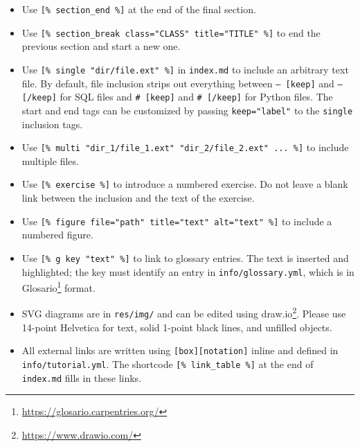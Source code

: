 \documentclass[krantzl]{krantz}
\newcommand{\hreffoot}[2]{{#1}\footnote{\href{#2}{#2}}}
\begin{document}
\begin{itemize}
\item 

Use \texttt{[\% section\_end \%]}
    at the end of the final section.



\item 

Use \texttt{[\% section\_break class="CLASS" title="TITLE" \%]}
    to end the previous section and start a new one.



\item 

Use \texttt{[\% single "dir/file.ext" \%]}
    in \texttt{index.md} to include an arbitrary text file.
    By default, file inclusion strips out everything between \texttt{-- [keep]} and \texttt{-- [/keep]}
    for SQL files and \texttt{\# [keep]} and \texttt{\# [/keep]} for Python files.
    The start and end tags can be customized by passing \texttt{keep="label"}
    to the \texttt{single} inclusion tags.



\item 

Use \texttt{[\% multi "dir\_1/file\_1.ext" "dir\_2/file\_2.ext" ... \%]}
    to include multiple files.



\item 

Use \texttt{[\% exercise \%]} to introduce a numbered exercise.
    Do not leave a blank link between the inclusion and the text of the exercise.



\item 

Use \texttt{[\% figure file="path" title="text" alt="text" \%]} to include a numbered figure.



\item 

Use \texttt{[\% g key "text" \%]} to link to glossary entries.
    The text is inserted and highlighted;
    the key must identify an entry in \texttt{info/glossary.yml},
    which is in \hreffoot{Glosario}{https://glosario.carpentries.org/} format.



\item 

SVG diagrams are in \texttt{res/img/} and can be edited using \hreffoot{draw.io}{https://www.drawio.com/}.
    Please use 14-point Helvetica for text,
    solid 1-point black lines,
    and unfilled objects.



\item 

All external links are written using \texttt{[box][notation]} inline
    and defined in \texttt{info/tutorial.yml}.
    The shortcode \texttt{[\% link\_table \%]} at the end of \texttt{index.md} fills in these links.



\end{itemize}
\end{document}

